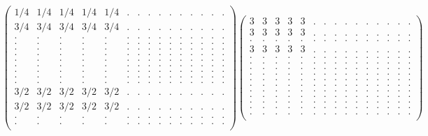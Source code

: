\documentclass[12pt,a4paper]{amsart}
\begin{document}
\begin{align*}
\left(\begin{array}{rrrrrrrrrrrrrrr}%
1/4&1/4&1/4&1/4&1/4&.&.&.&.&.&.&.&.&.&.\\%
3/4&3/4&3/4&3/4&3/4&.&.&.&.&.&.&.&.&.&.\\%
.&.&.&.&.&.&.&.&.&.&.&.&.&.&.\\%
.&.&.&.&.&.&.&.&.&.&.&.&.&.&.\\%
.&.&.&.&.&.&.&.&.&.&.&.&.&.&.\\%
.&.&.&.&.&.&.&.&.&.&.&.&.&.&.\\%
.&.&.&.&.&.&.&.&.&.&.&.&.&.&.\\%
.&.&.&.&.&.&.&.&.&.&.&.&.&.&.\\%
.&.&.&.&.&.&.&.&.&.&.&.&.&.&.\\%
.&.&.&.&.&.&.&.&.&.&.&.&.&.&.\\%
.&.&.&.&.&.&.&.&.&.&.&.&.&.&.\\%
3/2&3/2&3/2&3/2&3/2&.&.&.&.&.&.&.&.&.&.\\%
3/2&3/2&3/2&3/2&3/2&.&.&.&.&.&.&.&.&.&.\\%
.&.&.&.&.&.&.&.&.&.&.&.&.&.&.\\%
.&.&.&.&.&.&.&.&.&.&.&.&.&.&.\\%
\end{array}\right)%
\left(\begin{array}{rrrrrrrrrrrrrrr}%
3&3&3&3&3&.&.&.&.&.&.&.&.&.&.\\%
3&3&3&3&3&.&.&.&.&.&.&.&.&.&.\\%
.&.&.&.&.&.&.&.&.&.&.&.&.&.&.\\%
3&3&3&3&3&.&.&.&.&.&.&.&.&.&.\\%
.&.&.&.&.&.&.&.&.&.&.&.&.&.&.\\%
.&.&.&.&.&.&.&.&.&.&.&.&.&.&.\\%
.&.&.&.&.&.&.&.&.&.&.&.&.&.&.\\%
.&.&.&.&.&.&.&.&.&.&.&.&.&.&.\\%
.&.&.&.&.&.&.&.&.&.&.&.&.&.&.\\%
.&.&.&.&.&.&.&.&.&.&.&.&.&.&.\\%
.&.&.&.&.&.&.&.&.&.&.&.&.&.&.\\%
.&.&.&.&.&.&.&.&.&.&.&.&.&.&.\\%
.&.&.&.&.&.&.&.&.&.&.&.&.&.&.\\%
.&.&.&.&.&.&.&.&.&.&.&.&.&.&.\\%
.&.&.&.&.&.&.&.&.&.&.&.&.&.&.\\%
\end{array}\right)%
\end{align*}
\end{document}
